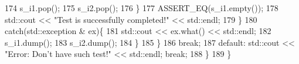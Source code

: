 \begin{DoxyCode}
174                         s\_i1.pop();
175                         s\_i2.pop();
176                     \}
177                     ASSERT\_EQ(s\_i1.empty());
178                     std::cout << \textcolor{stringliteral}{"Test is successfully completed!"} << std::endl;
179                 \}
180                 \textcolor{keywordflow}{catch}(std::exception & ex)\{
181                     std::cout << ex.what() << std::endl;
182                     s\_i1.dump();
183                     s\_i2.dump();
184                 \}
185                                            \}
186                 \textcolor{keywordflow}{break};
187             \textcolor{keywordflow}{default}: std::cout << \textcolor{stringliteral}{"Error: Don't have such test!"} << std::endl; \textcolor{keywordflow}{break}; 
188         \}
189     \}
\end{DoxyCode}
